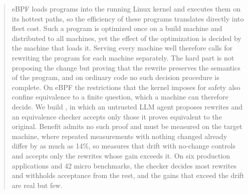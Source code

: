 \begin{abstract}
eBPF loads programs into the running Linux kernel and executes them on its hottest paths, so the efficiency of these programs translates directly into fleet cost.
Such a program is optimized once on a build machine and distributed to all machines, yet the effect of the optimization is decided by the machine that loads it.
Serving every machine well therefore calls for rewriting the program for each machine separately.
The hard part is not proposing the change but proving that the rewrite preserves the semantics of the program, and on ordinary code no such decision procedure is complete.
On eBPF the restrictions that the kernel imposes for safety also confine equivalence to a finite question, which a machine can therefore decide.
We build \sys, in which an untrusted LLM agent proposes rewrites and an equivalence checker accepts only those it proves equivalent to the original.
Benefit admits no such proof and must be measured on the target machine, where repeated measurements with nothing changed already differ by as much as 14\%, so \sys measures that drift with no-change controls and accepts only the rewrites whose gain exceeds it.
On six production applications and 42 micro benchmarks, the checker decides most rewrites and withholds acceptance from the rest, and the gains that exceed the drift are real but few.
\end{abstract}
